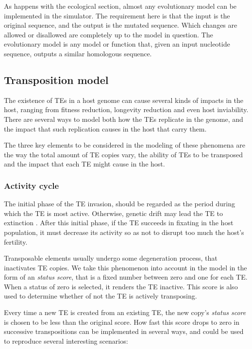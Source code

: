 \documentclass[10pt]{article}
\begin{document}
As happens with the ecological section, almost any evolutionary model
can be implemented in the simulator. The requirement here is that the
input is the original sequence, and the output is the mutated
sequence. Which changes are allowed or disallowed are completely up to
the model in question. The evolutionary model is any model or function
that, given an input nucleotide sequence, outputs a similar homologous
sequence.

\subsection{Transposition model}

The existence of TEs in a host genome can cause several kinds of
impacts in the host, ranging from fitness reduction, longevity
reduction and even host inviability. There are several ways to model
both how the TEs replicate in the genome, and the impact that such
replication causes in the host that carry them.

The three key elements to be considered in the modeling of these
phenomena are the way the total amount of TE copies vary, the ability
of TEs to be transposed and the impact that each TE might cause in the
host.

\subsubsection{Activity cycle}
The initial phase of the TE invasion, should be regarded as the period
during which the TE is most active. Otherwise, genetic drift may lead
the TE to extinction \cite{rouzic2005b}. After this initial phase, if
the TE succeeds in fixating in the host population, it must decrease
its activity so as not to disrupt too much the host's fertility.


Transposable elements usually undergo some degeneration process, that
inactivates TE copies. We take this phenomenon into account in the
model in the form of an \emph{status score}, that is a fixed number
between zero and one for each TE. When a status of zero is selected,
it renders the TE inactive. This score is also used to determine
whether of not the TE is actively transposing.

Every time a new TE is created from an existing TE, the new copy's
\emph{status score} is chosen to be less than the original score. How
fast this score drops to zero in successive transpositions can be
implemented in several ways, and could be used to reproduce several
interesting scenarios:
\end{document}
